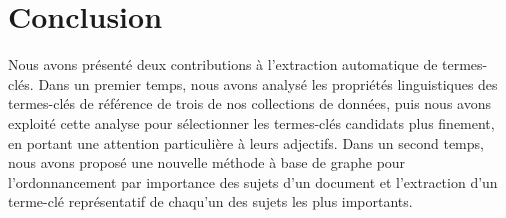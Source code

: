   \section{Conclusion}
  \label{sec:main-domain_independent_keyphrase_extraction-conclusion}
    Nous avons présenté deux contributions à l'extraction automatique de
    termes-clés. Dans un premier temps, nous avons analysé les propriétés
    linguistiques des termes-clés de référence de trois de nos collections de
    données, puis nous avons exploité cette analyse pour sélectionner les
    termes-clés candidats plus finement, en portant une attention particulière à
    leurs adjectifs. Dans un second temps, nous avons proposé une nouvelle
    méthode à base de graphe pour l'ordonnancement par importance des sujets
    d'un document et l'extraction d'un terme-clé représentatif de chaqu'un des
    sujets les plus importants.


